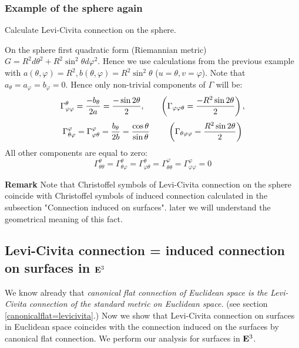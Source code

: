 \documentclass[12pt]{article}
\theoremstyle{theorem}
\numberwithin{equation}{section}
\begin{document}
\subsubsection {Example of the sphere again}

 {Calculate Levi-Civita connection on the sphere.

 On the sphere first quadratic form (Riemannian metric)
 $G=R^2d\theta^2+R^2\sin^2\theta d\varphi^2$.  Hence we
 use calculations from the previous example
 with $a(\theta,\varphi)=R^2, b(\theta,\varphi)=R^2\sin^2 \theta$
  ($u=\theta, v=\varphi$).
 Note that $a_\theta=a_\varphi=b_\varphi=0$.
  Hence only non-trivial components
 of $\Gamma$ will be:
\begin{equation}\label{Christoffelforsphere:}
  \Gamma^{\theta}_{\varphi\varphi}={-b_\theta\over 2a}={-\sin 2\theta\over 2},
  \qquad
  \left(\Gamma_{\varphi\varphi\theta}={-R^2\sin 2\theta\over 2}\right),
       \end{equation}
  \begin{equation}\label{connectionforsphere}
  \Gamma^{\varphi}_{\theta\varphi}=\Gamma^{\varphi}_{\varphi\theta}=
  {b_\theta\over 2b}={\cos\theta \over \sin\theta}\,
  \qquad
  \left(\Gamma_{\theta\varphi\varphi}={R^2\sin 2\theta\over 2}\right)
\end{equation}
All other components are equal to zero:
                 $$
  \Gamma^{\theta}_{\theta\theta}=\Gamma^{\theta}_{\theta\varphi}=\Gamma^{\theta}_{\varphi\theta}=
  \Gamma^{\varphi}_{\theta\theta}=\Gamma^{\varphi}_{\varphi\varphi}=0
             $$

{\bf Remark} Note that Christoffel symbols of Levi-Civita connection on the sphere coincide
with  Christoffel symbols of induced connection calculated
in the subsection "Connection induced on surfaces".
later we will understand the geometrical meaning of this fact.


\subsection {Levi-Civita connection = induced connection on surfaces in ${\bf E}^3$}




We know already that
{\it canonical flat connection of Euclidean space is the Levi-Civita connection
of the standard metric on Euclidean space.}
(see section \ref{canonicalflat=levicivita}.)
Now we show that Levi-Civita connection on surfaces in Euclidean space coincides with
 the connection induced on the surfaces by canonical flat connection.
We perform our analysis for surfaces in ${\bf E}^3$.

}
\end{document}
